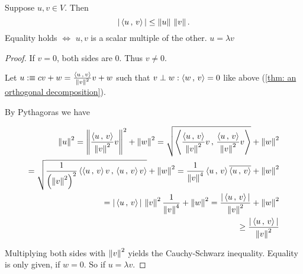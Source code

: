 \begin{thm}
  \label{thm: Cauchy-Schwarz inequality}
  Suppose $u,v \in V$. Then
  \begin{equation}
    |\ip{u}{v}| \leq \norm{u} \, \norm{v}.
  \end{equation}
  Equality holds $\iff$ $u,v$ is a scalar multiple of the other. $u=\lambda v$
\end{thm}
\begin{proof}
  If $v=0$, both sides are $0$. Thus $v\neq0 $.

  Let $u :\equiv cv+w = \frac{\ip{u}{v}}{\norm{v}^2} v + w$ such that $v\perp w: \ip{w}{v} = 0$ like above (\ref{thm: an orthogonal decomposition}).

  By Pythagoras we have

  \begin{minipage}{\linewidth}
  \begin{equation}
    \begin{aligned}
      \norm{u}^2
      = \norm{ \frac{\ip{u}{v}}{\norm{v}^2} v}^2 + \norm{w}^2
      = \sqrt{ \ip{\frac{\ip{u}{v}}{\norm{v}^2}  v}{\frac{\ip{u}{v}}{\norm{v}^2} v}} + \norm{w}^2 \\
      = \sqrt{ \frac{1}{ \left(\norm{v}^2 \right  )^2}\ip{\ip{u}{v}v}{\ip{u}{v}v}} + \norm{w}^2
      = \frac{1}{\norm{v}^4} \ip{u}{v} \overline{\ip{u}{v}} + \norm{w}^2 \\
      = |\ip{u}{v}| \, \norm {v}^2 \frac{1}{\norm{v}^4} + \norm{w}^2
      = \frac{|\ip{u}{v}|}{\norm{v}^2} + \norm{w}^2 \\
      \geq \frac{|\ip{u}{v}|}{\norm{v}^2}
    \end{aligned}
  \end{equation}
  \end{minipage}

  Multiplying both sides with $\norm{v}^2$ yields the Cauchy-Schwarz inequality. Equality is only given, if $w=0$. So if $u=\lambda v$.
\end{proof}

